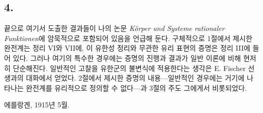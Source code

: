 
\subsection*{4.}
끝으로 여기서 도출한 결과들이 나의 논문 \emph{Körper und Systeme rationaler Funktionen}에 암묵적으로 포함되어 있음을 언급해 둔다. 구체적으로 1절에서 제시한 완전계는 정리 VI와 VII에, 이 유한성 정리와 무관한 유리 표현의 증명은 정리 III에 들어 있다. 그러나 여기의 특수한 경우에는 증명의 진행과 결과가 일반 이론에 비해 현저히 단순해진다. 일반적인 고찰을 유한군의 불변식에 적용한다는 생각은 E. Fischer 선생과의 대화에서 얻었다. 2절에서 제시한 증명의 내용---일반적인 경우에는 거기에 나타나는 완전계를 유리적으로 정의할 수 없다---과 3절의 주도 그에게서 비롯되었다.

에를랑겐, 1915년 5월.
